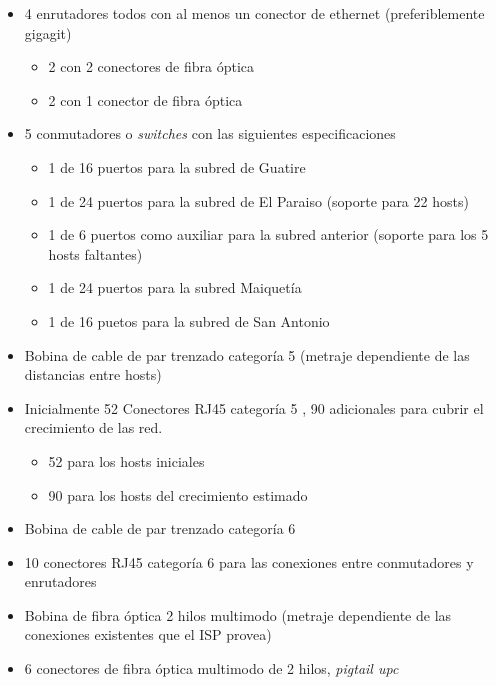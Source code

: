 \documentclass[]{article}
\begin{document}
\begin{itemize}
\itemsep1pt\parskip0pt
\item
  4 enrutadores todos con al menos un conector de ethernet
  (preferiblemente gigagit)

  \begin{itemize}
  \itemsep1pt\parskip0pt
  \item
    2 con 2 conectores de fibra óptica
  \item
    2 con 1 conector de fibra óptica
  \end{itemize}
\item
  5 conmutadores o \emph{switches} con las siguientes especificaciones

  \begin{itemize}
  \itemsep1pt\parskip0pt
  \item
    1 de 16 puertos para la subred de Guatire
  \item
    1 de 24 puertos para la subred de El Paraiso (soporte para 22 hosts)
  \item
    1 de 6 puertos como auxiliar para la subred anterior (soporte para
    los 5 hosts faltantes)
  \item
    1 de 24 puertos para la subred Maiquetía
  \item
    1 de 16 puetos para la subred de San Antonio
  \end{itemize}
\item
  Bobina de cable de par trenzado categoría 5 (metraje dependiente de
  las distancias entre hosts)
\item
  Inicialmente 52 Conectores RJ45 categoría 5 , 90 adicionales para
  cubrir el crecimiento de las red.

  \begin{itemize}
  \itemsep1pt\parskip0pt
  \item
    52 para los hosts iniciales
  \item
    90 para los hosts del crecimiento estimado
  \end{itemize}
\item
  Bobina de cable de par trenzado categoría 6
\item
  10 conectores RJ45 categoría 6 para las conexiones entre conmutadores
  y enrutadores
\item
  Bobina de fibra óptica 2 hilos multimodo (metraje dependiente de las
  conexiones existentes que el ISP provea)
\item
  6 conectores de fibra óptica multimodo de 2 hilos, \emph{pigtail upc}
\end{itemize}
\end{document}
